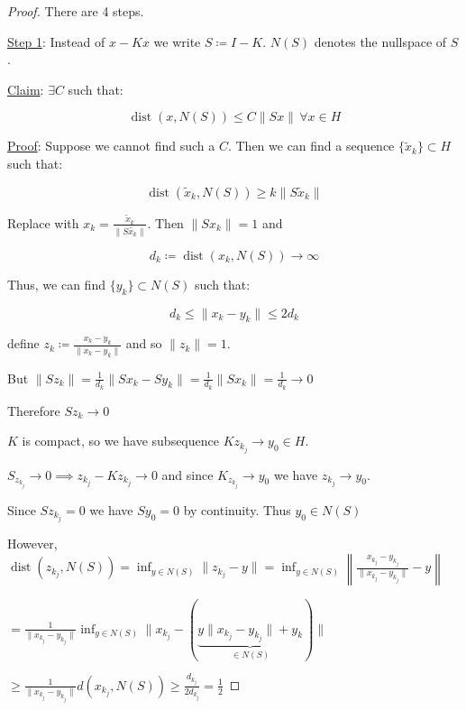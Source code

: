 \documentclass{article}
\theoremstyle{definition}
\begin{document}
\begin{proof}
    There are 4 steps.

    \underline{Step 1}: Instead of \(x - Kx\) we write \(S\coloneqq I - K\). \(N(S)\) denotes the nullspace of \(S\).
    
    \underline{Claim}: \(\exists C\) such that:

    \[
        \operatorname{dist}(x,N(S)) \leq C \lVert Sx \rVert \, \forall x\in H
    \]

    \underline{Proof}: Suppose we cannot find such a \(C\). Then we can find a sequence \(\{\tilde{x}_k\} \subset H\) such that:
    
    \[
        \operatorname{dis t}(\tilde{x}_k, N(S)) \geq k \lVert S \tilde{x}_k \rVert  
    \]

    Replace with \(x_k = \frac{\tilde{x}_k}{\lVert S \tilde{x_k} \rVert }\). Then \(\lVert S x_k \rVert = 1\) and
    
    \[
        d_k \coloneqq \operatorname{dis t}(x_k, N(S)) \to \infty  
    \]

    Thus, we can find \(\{ y_k \} \subset N(S)\) such that:

    \[
        d_k \leq \lVert x_k - y_k \rVert \leq 2d_k
    \]

    define \(z_k \coloneqq \frac{x_k - y_k}{\lVert x_k - y_k \rVert }\) and so \(\lVert z_k \rVert = 1\).

    But \(\lVert Sz_k \rVert = \frac{1}{d_k} \lVert S x_k - S y_k \rVert = \frac{1}{d_k}\lVert S x_k \rVert = \frac{1}{d_k} \to 0\) 

    Therefore \(Sz_k \to 0\)

    \(K\) is compact, so we have subsequence \(Kz_{k_j} \to y_0 \in H\). 

    \(S_{z_{k_j}}\to 0 \implies z_{k_j} - Kz_{k_j} \to 0\) and since  \(K_{z_{k_j}}\to y_0\) we have \(z_{k_j} \to y_0\). 

    Since \(Sz_{k_j} = 0\) we have \(S y_0 = 0\) by continuity. Thus \(y_0 \in N(S)\) 
    
    However, \(\operatorname{dis t}(z_{k_j}, N(S)) = \inf_{y\in N(S)} \lVert z_{k_j} - y \rVert = \inf_{y\in N(S)} \left\lVert \frac{x_{k_j}-y_{k_j}}{\lVert x_{k_j}-y_{k_j} \rVert} - y \right\rVert  \) 

    \(= \frac{1}{\lVert x_{k_j} - y_{k_j} \rVert} \inf_{y\in N(S)} \lVert x_{k_j} - (\underbrace{y \lVert x_{k_j} - y_{k_j} \rVert + y_k}_{\in N(S)}) \rVert\)
    
    \(\geq \frac{1}{\lVert x_{k_j} - y_{k_j} \rVert} d(x_{k_j},N(S)) \geq \frac{d_{k_j}}{2d_{k_j}} =\frac{1}{2}\) 


\end{proof}
\end{document}
